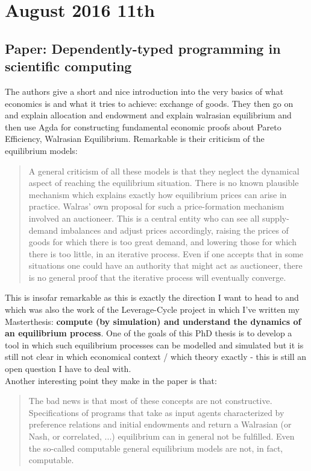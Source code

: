 \section*{August 2016 11th}
\subsection*{Paper: Dependently-typed programming in scientific computing \cite{Ionescu2013}}
The authors give a short and nice introduction into the very basics of what economics is and what it tries to achieve: exchange of goods. They then go on and explain allocation and endowment and explain walrasian equilibrium and then use Agda for constructing fundamental economic proofs about Pareto Efficiency, Walrasian Equilibrium. Remarkable is their criticism of the equilibrium models:

\begin{quote}
A general criticism of all these models is that they neglect the dynamical
aspect of reaching the equilibrium situation. There is no known plausible mechanism
which explains exactly how equilibrium prices can arise in practice. Walras'
own proposal for such a price-formation mechanism involved an auctioneer. This
is a central entity who can see all supply-demand imbalances and adjust prices
accordingly, raising the prices of goods for which there is too great demand, and
lowering those for which there is too little, in an iterative process. Even if one
accepts that in some situations one could have an authority that might act as
auctioneer, there is no general proof that the iterative process will eventually
converge.
\end{quote}

This is insofar remarkable as this is exactly the direction I want to head to and which was also the work of the Leverage-Cycle project in which I've written my Masterthesis: \textbf{compute (by simulation) and understand the dynamics of an equilibrium process}. One of the goals of this PhD thesis is to develop a tool in which such equilibrium processes can be modelled and simulated but it is still not clear in which economical context / which theory exactly - this is still an open question I have to deal with. \\

Another interesting point they make in the paper is that:

\begin{quote}
The bad news is that most of these concepts are not constructive. Specifications of programs that take as input agents characterized by preference relations and initial endowments and return a Walrasian (or Nash, or correlated, ...) equilibrium can in general not be fulfilled. Even the so-called computable general equilibrium models are not, in fact, computable.
\end{quote}

